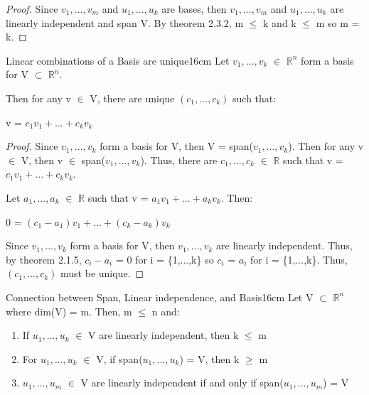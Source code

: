     \begin{proof}
        Since $v_1,...,v_m$ and $u_1,...,u_k$ are bases,
        then $v_1,...,v_m$ and $u_1,...,u_k$ are linearly independent
        and span V.
        By {\color{red} theorem 2.3.2}, m $\leq$ k and k $\leq$ m
        so m = k.
    \end{proof}

    \vspace{0.5cm}



    \begin{wtheorem}{Linear combinations of a Basis are unique}{16cm}
        Let $v_1,...,v_k$ $\in$ $\mathbb{R}^n$ form a basis for
        V $\subset$ $\mathbb{R}^n$.
        
        Then for any v $\in$ V, there are unique $(c_1,...,c_k)$ such that:

        \hspace{0.5cm}
        v = $c_1v_1 + ... + c_kv_k$
    \end{wtheorem}

    \begin{proof}
        Since $v_1,...,v_k$ form a basis for V,
        then V = span($v_1,...,v_k$).
        Then for any v $\in$ V, then v $\in$ span($v_1,...,v_k$).
        Thus, there are $c_1,...,c_k$ $\in$ $\mathbb{R}$
        such that v = $c_1v_1 + ... + c_kv_k$.

        Let $a_1,...,a_k$ $\in$ $\mathbb{R}$ such that
        v = $a_1v_1 + ... + a_kv_k$. Then:

        \hspace{0.5cm}
        0 = $(c_1-a_1)v_1 + ... + (c_k-a_k)v_k$

        Since $v_1,...,v_k$ form a basis for V,
        then $v_1,...,v_k$ are linearly independent.
        Thus, by {\color{red} theorem 2.1.5}, $c_i - a_i$ = 0 for
        i = \{1,...,k\} so $c_i$ = $a_i$ for i = \{1,...,k\}.
        Thus, $(c_1,...,c_k)$ must be unique.
    \end{proof}

    \vspace{0.5cm}



    \begin{wtheorem}{Connection between Span, Linear independence, and Basis}{16cm}
        Let V $\subset$ $\mathbb{R}^n$ where dim(V) = m. Then, m $\leq$ n and:
    \end{wtheorem}

    \begin{enumerate}[label=(\alph*), leftmargin=2cm, itemsep=0.1cm]
        \item If $u_1,...,u_k$ $\in$ V are linearly independent,
            then k $\leq$ m

        \item For $u_1,...,u_k$ $\in$ V, if span($u_1,...,u_k$) = V,
            then k $\geq$ m

        \item $u_1,...,u_m$ $\in$ V are linearly independent if and only if
            span($u_1,...,u_m$) = V
    \end{enumerate}

